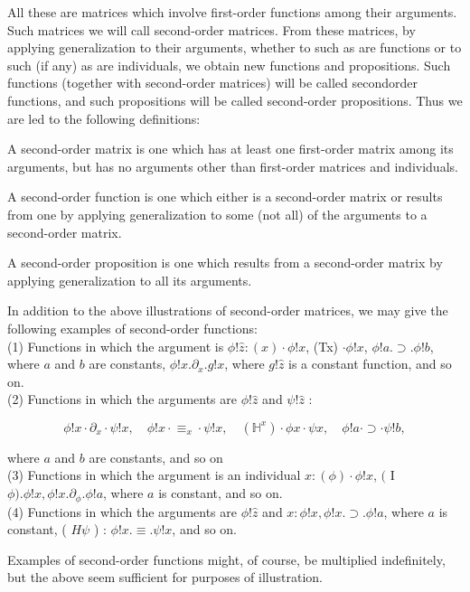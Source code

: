 \documentclass[10pt]{article}
\begin{document}
All these are matrices which involve first-order functions among their arguments. Such matrices we will call second-order matrices. From these matrices, by applying generalization to their arguments, whether to such as are functions or to such (if any) as are individuals, we obtain new functions and propositions. Such functions (together with second-order matrices) will be called secondorder functions, and such propositions will be called second-order propositions. Thus we are led to the following definitions:

A second-order matrix is one which has at least one first-order matrix among its arguments, but has no arguments other than first-order matrices and individuals.

A second-order function is one which either is a second-order matrix or results from one by applying generalization to some (not all) of the arguments to a second-order matrix.

A second-order proposition is one which results from a second-order matrix by applying generalization to all its arguments.

In addition to the above illustrations of second-order matrices, we may give the following examples of second-order functions:\\
(1) Functions in which the argument is $\phi!\hat{z}:(x) \cdot \phi!x$, (Tx) $\cdot \phi!x$, $\phi!a . \supset . \phi!b$, where $a$ and $b$ are constants, $\phi!x . \partial_{x} . g!x$, where $g!\hat{z}$ is a constant function, and so on.\\
(2) Functions in which the arguments are $\phi!\hat{z}$ and $\psi!\hat{z}$ :

$$
\phi!x \cdot \partial_{x} \cdot \psi!x, \quad \phi!x \cdot \equiv_{x} \cdot \psi!x, \quad\left(\mathbb{H}^{x}\right) \cdot \phi x \cdot \psi x, \quad \phi!a \cdot \supset \cdot \psi!b,
$$

where $a$ and $b$ are constants, and so on\\
(3) Functions in which the argument is an individual $x:(\phi) \cdot \phi!x$, $($ I $\phi) . \phi!x, \phi!x . \partial_{\phi} . \phi!a$, where $a$ is constant, and so on.\\
(4) Functions in which the arguments are $\phi!\hat{z}$ and $x: \phi!x, \phi!x . \supset . \phi!a$, where $a$ is constant, ( $H \psi$ ) : $\phi!x . \equiv . \psi!x$, and so on.

Examples of second-order functions might, of course, be multiplied indefinitely, but the above seem sufficient for purposes of illustration.
\end{document}

